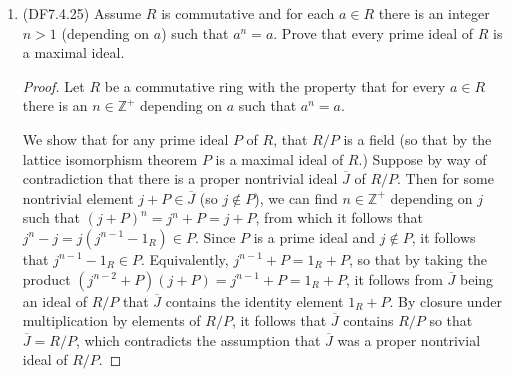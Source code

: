 \documentclass[11pt]{article}
\begin{document}
\begin{enumerate}
\begin{enumerate}[label=\textbf{(\alph*)}]
\begin{proof}
        When $\varphi$ is the inclusion homomorphism, it follows that $\varphi^{-1}(P) = P\cap R$ (since $P\cap R$ contains all of the elements of $R$ which map into $P$ under $\varphi$). By the previous result, it follows that $P\cap R$ is either $R$ or is a prime ideal of $R$.
      \end{proof}
      \item Prove that if $M$ is a maximal ideal of $S$ and $\varphi$ is surjective then $\varphi^{-1}(M)$ is a maximal ideal of $R$. Give an example to show that this need not be the case if $\varphi$ is not surjective.
      \begin{proof}
        Let $\pi\colon S\to S/M$ be the projection map, which is surjective. Then the composition $\pi\circ \varphi\colon R\to S/M$ is surjective since both $\pi,\varphi$ are surjective. The kernel of $\pi\circ \varphi$ is found by investigating which elements $r\in R$ are mapped to $0_S+M$ in $S/M$: If $\pi(\varphi(r)) = 0_S + M$, it follows that $\varphi(r)\in M$, so that $r\in \varphi^{-1}(M)$. Hence $\ker(\pi\circ\varphi) = \varphi^{-1}(M)$, and by the first isomorphism theorem we have that \[\frac{R}{\varphi^{-1}(M)}\cong \frac{S}{M}.\] Since $M$ is a maximal ideal in $S$, the quotient ring $S/M$ is a field, so that $R/\varphi^{-1}(M)$ is also a field. It follows from the lattice isomorphism theorem that $\varphi^{-1}(M)$ is a maximal ideal of $R$ (since there are no ideals outside of $R/\varphi^{-1}(M)$ and the trivial ideal in $R/\varphi^{-1}(M)$, it follows that there are no proper ideals of $R$ containing $\varphi^{-1}(M)$ outside of $\varphi^{-1}(M)$).
      \end{proof}
    \end{enumerate}
    \item (DF7.4.25) Assume $R$ is commutative and for each $a\in R$ there is an integer $n>1$ (depending on $a$) such that $a^n = a$. Prove that every prime ideal of $R$ is a maximal ideal.
    \begin{proof}
      Let $R$ be a commutative ring with the property that for every $a\in R$ there is an $n\in \mathbb{Z}^+$ depending on $a$ such that $a^n = a$.

      We show that for any prime ideal $P$ of $R$, that $R/P$ is a field (so that by the lattice isomorphism theorem $P$ is a maximal ideal of $R$.) Suppose by way of contradiction that there is a proper nontrivial ideal $\overline{J}$ of $R/P$. Then for some nontrivial element $j+P\in \overline{J}$ (so $j\not\in P$), we can find $n\in \mathbb{Z}^+$ depending on $j$ such that $(j+P)^n = j^n + P = j+P$, from which it follows that $j^n - j = j(j^{n-1}-1_R)\in P$. Since $P$ is a prime ideal and $j\not\in P$, it follows that $j^{n-1}-1_R\in P$. Equivalently, $j^{n-1} + P = 1_R+P$, so that by taking the product $(j^{n-2}+P)(j+P) = j^{n-1} + P = 1_R+P$, it follows from $\overline{J}$ being an ideal of $R/P$ that $\overline{J}$ contains the identity element $1_R + P$. By closure under multiplication by elements of $R/P$, it follows that $\overline{J}$ contains $R/P$ so that $\overline{J} = R/P$, which contradicts the assumption that $\overline{J}$ was a proper nontrivial ideal of $R/P$.


\end{proof}
\end{enumerate}
\end{document}

